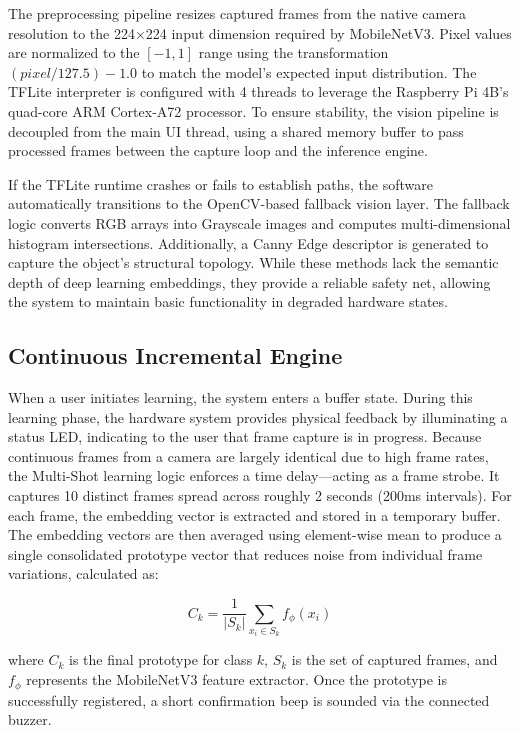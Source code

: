 \documentclass[12pt,a4paper]{report}
\begin{document}
The preprocessing pipeline resizes captured frames from the native camera resolution to the 224$\times$224 input dimension required by MobileNetV3. Pixel values are normalized to the $[-1, 1]$ range using the transformation $(pixel / 127.5) - 1.0$ to match the model's expected input distribution. The TFLite interpreter is configured with 4 threads to leverage the Raspberry Pi 4B's quad-core ARM Cortex-A72 processor. To ensure stability, the vision pipeline is decoupled from the main UI thread, using a shared memory buffer to pass processed frames between the capture loop and the inference engine.

If the TFLite runtime crashes or fails to establish paths, the software automatically transitions to the OpenCV-based fallback vision layer. The fallback logic converts RGB arrays into Grayscale images and computes multi-dimensional histogram intersections. Additionally, a Canny Edge descriptor is generated to capture the object's structural topology. While these methods lack the semantic depth of deep learning embeddings, they provide a reliable safety net, allowing the system to maintain basic functionality in degraded hardware states.

\subsection{Continuous Incremental Engine}
When a user initiates learning, the system enters a buffer state. During this learning phase, the hardware system provides physical feedback by illuminating a status LED, indicating to the user that frame capture is in progress. Because continuous frames from a camera are largely identical due to high frame rates, the Multi-Shot learning logic enforces a time delay---acting as a frame strobe. It captures 10 distinct frames spread across roughly 2 seconds (200ms intervals). For each frame, the embedding vector is extracted and stored in a temporary buffer. The embedding vectors are then averaged using element-wise mean to produce a single consolidated prototype vector that reduces noise from individual frame variations, calculated as:

\begin{equation}
    C_k = \frac{1}{|S_k|} \sum_{x_i \in S_k} f_\phi(x_i)
\end{equation}

\noindent
where $C_k$ is the final prototype for class $k$, $S_k$ is the set of captured frames, and $f_\phi$ represents the MobileNetV3 feature extractor. Once the prototype is successfully registered, a short confirmation beep is sounded via the connected buzzer.
\end{document}

